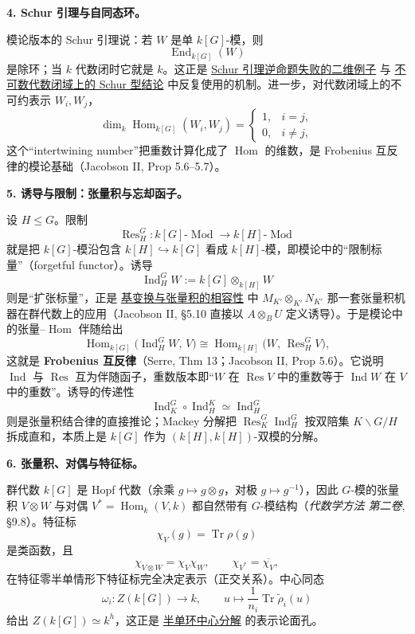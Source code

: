 \documentclass[a4paper]{ctexart}
\theoremstyle{definition}
\theoremstyle{analysis}
\theoremstyle{plain}
\begin{document}
\medskip
\textbf{4. Schur 引理与自同态环。}

模论版本的 Schur 引理说：若 \(W\) 是单 \(k[G]\)-模，则
\[
  \operatorname{End}_{k[G]}(W)
\]
是除环；当 \(k\) 代数闭时它就是 \(k\)。这正是 \hyperref[subsec:problem-schur-converse-counterexample]{Schur 引理逆命题失败的二维例子} 与 \hyperref[subsec:problem-schur-uncountable-field]{不可数代数闭域上的 Schur 型结论} 中反复使用的机制。进一步，对代数闭域上的不可约表示 \(W_i,W_j\)，
\[
  \dim_k\operatorname{Hom}_{k[G]}(W_i,W_j)=
  \begin{cases}
    1,& i=j,\\
    0,& i\neq j,
  \end{cases}
\]
这个“intertwining number”把重数计算化成了 \(\operatorname{Hom}\) 的维数，是 Frobenius 互反律的模论基础（Jacobson II, Prop 5.6--5.7）。

\medskip
\textbf{5. 诱导与限制：张量积与忘却函子。}

设 \(H\le G\)。限制
\[
  \operatorname{Res}_H^G:k[G]\text{-}\operatorname{Mod}\longrightarrow k[H]\text{-}\operatorname{Mod}
\]
就是把 \(k[G]\)-模沿包含 \(k[H]\hookrightarrow k[G]\) 看成 \(k[H]\)-模，即模论中的“限制标量”（forgetful functor）。诱导
\[
  \operatorname{Ind}_H^G W:=k[G]\otimes_{k[H]}W
\]
则是“扩张标量”，正是 \hyperref[subsec:problem-base-change-tensor]{基变换与张量积的相容性} 中 \(M_{K'}\otimes_{K'}N_{K'}\) 那一套张量积机器在群代数上的应用（Jacobson II, \S 5.10 直接以 \(A\otimes_B U\) 定义诱导）。于是模论中的张量--\(\operatorname{Hom}\) 伴随给出
\[
  \operatorname{Hom}_{k[G]}\bigl(\operatorname{Ind}_H^G W,\,V\bigr)
  \cong
  \operatorname{Hom}_{k[H]}\bigl(W,\,\operatorname{Res}_H^G V\bigr),
\]
这就是 \textbf{Frobenius 互反律}（Serre, Thm 13；Jacobson II, Prop 5.6）。它说明 \(\operatorname{Ind}\) 与 \(\operatorname{Res}\) 互为伴随函子，重数版本即“\(W\) 在 \(\operatorname{Res}V\) 中的重数等于 \(\operatorname{Ind}W\) 在 \(V\) 中的重数”。诱导的传递性
\[
  \operatorname{Ind}_K^G\circ\operatorname{Ind}_H^K\simeq\operatorname{Ind}_H^G
\]
则是张量积结合律的直接推论；Mackey 分解把 \(\operatorname{Res}_K^G\operatorname{Ind}_H^G\) 按双陪集 \(K\backslash G/H\) 拆成直和，本质上是 \(k[G]\) 作为 \((k[H],k[H])\)-双模的分解。

\medskip
\textbf{6. 张量积、对偶与特征标。}

群代数 \(k[G]\) 是 Hopf 代数（余乘 \(g\mapsto g\otimes g\)，对极 \(g\mapsto g^{-1}\)），因此 \(G\)-模的张量积 \(V\otimes W\) 与对偶 \(V^*=\operatorname{Hom}_k(V,k)\) 都自然带有 \(G\)-模结构（\textit{代数学方法 第二卷}, \S 9.8）。特征标
\[
  \chi_V(g)=\operatorname{Tr}\rho(g)
\]
是类函数，且
\[
  \chi_{V\otimes W}=\chi_V\chi_W,\qquad
  \chi_{V^*}=\overline{\chi_V},
\]
在特征零半单情形下特征标完全决定表示（正交关系）。中心同态
\[
  \omega_i:Z(k[G])\longrightarrow k,\qquad
  u\longmapsto \frac1{n_i}\operatorname{Tr}\widetilde\rho_i(u)
\]
给出 \(Z(k[G])\simeq k^h\)，这正是 \hyperref[subsec:topic-simple-semisimple-rings]{半单环中心分解} 的表示论面孔。
\end{document}
